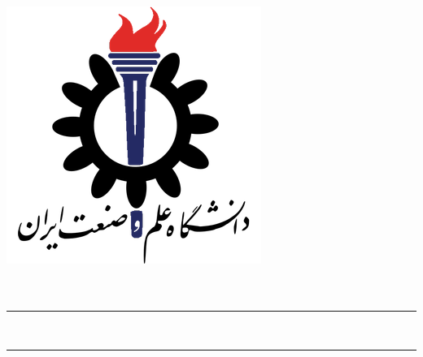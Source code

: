 \begin{titlepage}
    \centering
    \includegraphics[scale = 0.5]{Images/IUSTLogo.png}\\
    \Huge{\Faculty}\\[0.2 cm]
    \huge{\Course}\\[0.2 cm]
    \LARGE{\Semester}
    
    \rule{\linewidth}{1.0 mm}
    \huge{\Subject}\\[0.2 cm]
    \LARGE{\Title}
    \rule{\linewidth}{1.0 mm}\\[1.0 cm]
    
    \begin{minipage}{0.95 \textwidth}
        \centering
	    \Prof \dotfill \prof\\[0.15 cm]
	    \Members \dotfill \members\\[0.15 cm]
	    \SID \dotfill \sid\\[0.15 cm]
	\end{minipage}

\end{titlepage}